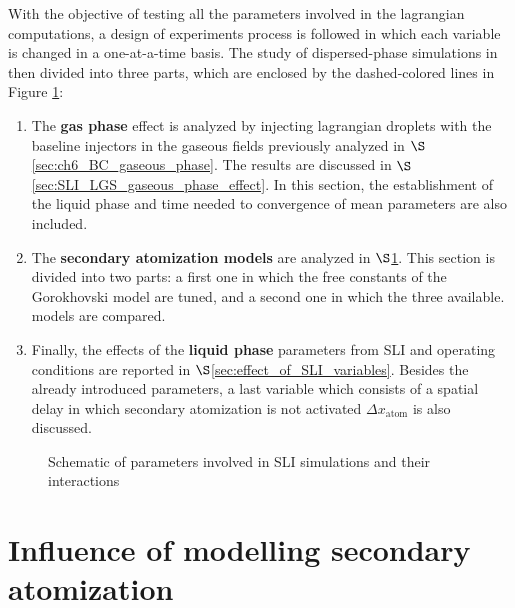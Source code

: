 \clearpage






With the objective of testing all the parameters involved in the lagrangian computations, a design of experiments process is followed in which each variable is changed in a one-at-a-time basis. The study of dispersed-phase simulations in then divided into three parts, which are enclosed by the dashed-colored lines in Figure  \ref{fig:dispersed_phase_sli_parameters}:

\begin{enumerate}

	\item The \textbf{gas phase} effect is analyzed by injecting lagrangian droplets with the baseline injectors in the gaseous fields previously analyzed in $\S$\ref{sec:ch6_BC_gaseous_phase}. The results are discussed in $\S$\ref{sec:SLI_LGS_gaseous_phase_effect}. In this section, the establishment of the liquid phase and time needed to convergence of mean parameters are also  included.
	
	\item The \textbf{secondary atomization models} are analyzed in $\S$\ref{sec:SLI_LGS_secondary_breakup_models}. This section is divided into two parts: a first one in which the free constants of the Gorokhovski model are tuned, and a second one in which the three available. models are compared.
	
	\item Finally, the effects of the \textbf{liquid phase} parameters from SLI and operating conditions are reported in $\S$\ref{sec:effect_of_SLI_variables}. Besides the already introduced parameters, a last variable which consists of a spatial delay in which secondary atomization is not activated $\Delta x_\mathrm{atom}$ is also discussed.

\end{enumerate}

\clearpage

\begin{figure}[ht]	
	\centering	{}
	\caption{Schematic of parameters involved in SLI simulations and their interactions}	\label{fig:dispersed_phase_sli_parameters}
\end{figure}




\section{Influence of modelling secondary atomization}
\label{sec:SLI_LGS_secondary_breakup_models}

